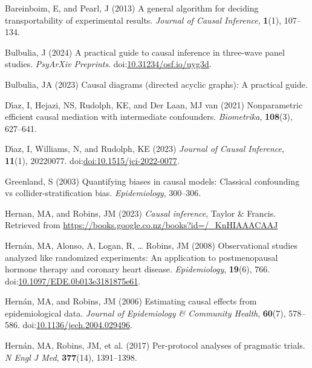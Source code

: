 \documentclass[
  single column]{article}
\newlength{\cslhangindent}
\newenvironment{CSLReferences}[2] %
 {\begin{list}{}{%
  \setlength{\itemindent}{0pt}
  \setlength{\leftmargin}{0pt}
  \setlength{\parsep}{0pt}
  \ifodd #1
   \setlength{\leftmargin}{\cslhangindent}
   \setlength{\itemindent}{-1\cslhangindent}
  \fi
  \setlength{\itemsep}{#2\baselineskip}}}
 {\end{list}}
\begin{document}
\label{refs}
\begin{CSLReferences}{1}{0}
Bareinboim, E, and Pearl, J (2013) A general algorithm for deciding
transportability of experimental results. \emph{Journal of Causal
Inference}, \textbf{1}(1), 107--134.

Bulbulia, J (2024) A practical guide to causal inference in three-wave
panel studies. \emph{PsyArXiv Preprints}.
doi:\href{https://doi.org/10.31234/osf.io/uyg3d}{10.31234/osf.io/uyg3d}.

Bulbulia, JA (2023) Causal diagrams (directed acyclic graphs): A
practical guide.

Dı́az, I, Hejazi, NS, Rudolph, KE, and Der Laan, MJ van (2021)
Nonparametric efficient causal mediation with intermediate confounders.
\emph{Biometrika}, \textbf{108}(3), 627--641.

Dı́az, I, Williams, N, and Rudolph, KE (2023) \emph{Journal of Causal
Inference}, \textbf{11}(1), 20220077.
doi:\href{https://doi.org/doi:10.1515/jci-2022-0077}{doi:10.1515/jci-2022-0077}.

Greenland, S (2003) Quantifying biases in causal models: Classical
confounding vs collider-stratification bias. \emph{Epidemiology},
300--306.

Hernan, MA, and Robins, JM (2023) \emph{Causal inference}, Taylor \&
Francis. Retrieved from
\url{https://books.google.co.nz/books?id=/_KnHIAAACAAJ}

Hernán, MA, Alonso, A, Logan, R, \ldots{} Robins, JM (2008)
Observational studies analyzed like randomized experiments: An
application to postmenopausal hormone therapy and coronary heart
disease. \emph{Epidemiology}, \textbf{19}(6), 766.
doi:\href{https://doi.org/10.1097/EDE.0b013e3181875e61}{10.1097/EDE.0b013e3181875e61}.

Hernán, MA, and Robins, JM (2006) Estimating causal effects from
epidemiological data. \emph{Journal of Epidemiology \& Community
Health}, \textbf{60}(7), 578--586.
doi:\href{https://doi.org/10.1136/jech.2004.029496}{10.1136/jech.2004.029496}.

Hernán, MA, Robins, JM, et al. (2017) Per-protocol analyses of pragmatic
trials. \emph{N Engl J Med}, \textbf{377}(14), 1391--1398.


\end{CSLReferences}
\end{document}
